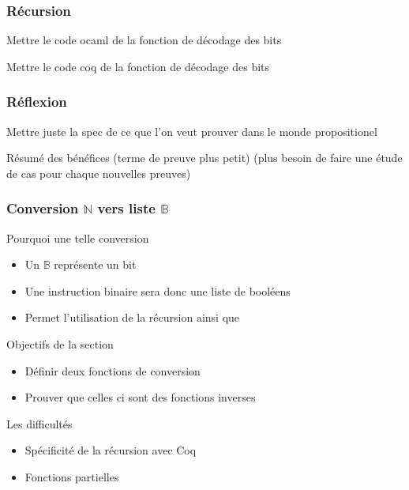 \documentclass{beamer}
\begin{document}
\begin{frame}[b,fragile]
\frametitle{Récursion} 

\begin{block}
  Mettre le code ocaml de la fonction de décodage des bits
\end{block}


\begin{block}
  Mettre le code coq de la fonction de décodage des bits
\end{block}


\end{frame}


\begin{frame}[b,fragile]
\frametitle{Réflexion} 

\begin{block}
Mettre juste la spec de ce que l'on veut prouver dans le monde propositionel
\end{block}


\begin{block}
  Résumé des bénéfices (terme de preuve plus petit) (plus besoin de faire une étude de cas pour chaque nouvelles preuves)
\end{block}


\end{frame}

\begin{frame}[b,fragile]
\frametitle{Conversion $\mathbb{N}$ vers liste $\mathbb{B}$} 

\begin{block}{Pourquoi une telle conversion}
  \begin{itemize}
  \item Un $\mathbb{B}$ représente un bit
  \item Une instruction binaire sera donc une liste de booléens
  \item Permet l'utilisation de la récursion ainsi que 
  \end{itemize}   
\end{block}

\begin{block}{Objectifs de la section}
  \begin{itemize}
  \item Définir deux fonctions de conversion
  \item Prouver que celles ci sont des fonctions inverses
  \end{itemize}   
\end{block}

\begin{block}{Les difficultés}
  \begin{itemize}
  \item Spécificité de la récursion avec Coq
  \item Fonctions partielles
  \end{itemize}   
\end{block}


\end{frame}
\end{document}
